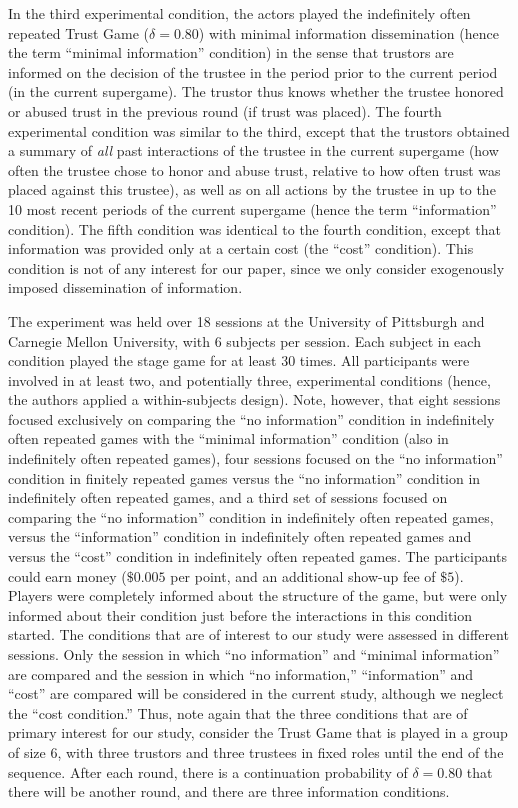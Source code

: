 \documentclass[
  11pt,
]{article}
\begin{document}
In the third experimental condition, the actors played the indefinitely often repeated Trust Game (\(\delta = 0.80\)) with minimal information dissemination (hence the term ``minimal information'' condition) in the sense that trustors are informed on the decision of the trustee in the period prior to the current period (in the current supergame). The trustor thus knows whether the trustee honored or abused trust in the previous round (if trust was placed). The fourth experimental condition was similar to the third, except that the trustors obtained a summary of \emph{all} past interactions of the trustee in the current supergame (how often the trustee chose to honor and abuse trust, relative to how often trust was placed against this trustee), as well as on all actions by the trustee in up to the 10 most recent periods of the current supergame (hence the term ``information'' condition).
The fifth condition was identical to the fourth condition, except that information was provided only at a certain cost (the ``cost'' condition).
This condition is not of any interest for our paper, since we only consider exogenously imposed dissemination of information.

The experiment was held over 18 sessions at the University of Pittsburgh and Carnegie Mellon University, with 6 subjects per session. Each subject in each condition played the stage game for at least 30 times. All participants were involved in at least two, and potentially three, experimental conditions (hence, the authors applied a within-subjects design). Note, however, that eight sessions focused exclusively on comparing the ``no information'' condition in indefinitely often repeated games with the ``minimal information'' condition (also in indefinitely often repeated games), four sessions focused on the ``no information'' condition in finitely repeated games versus the ``no information'' condition in indefinitely often repeated games, and a third set of sessions focused on comparing the ``no information'' condition in indefinitely often repeated games, versus the ``information'' condition in indefinitely often repeated games and versus the ``cost'' condition in indefinitely often repeated games. The participants could earn money (\(\$0.005\) per point, and an additional show-up fee of \(\$5\)). Players were completely informed about the structure of the game, but were only informed about their condition just before the interactions in this condition started.
The conditions that are of interest to our study were assessed in different sessions.
Only the session in which ``no information'' and ``minimal information'' are compared and the session in which ``no information,'' ``information'' and ``cost'' are compared will be considered in the current study, although we neglect the ``cost condition.'' Thus, note again that the three conditions that are of primary interest for our study, consider the Trust Game that is played in a group of size 6, with three trustors and three trustees in fixed roles until the end of the sequence. After each round, there is a continuation probability of \(\delta = 0.80\) that there will be another round, and there are three information conditions.
\end{document}
